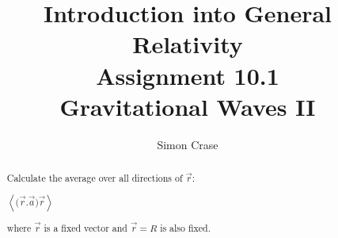 \documentclass[]{article}
\title{Introduction into General Relativity\\Assignment 10.1\\Gravitational Waves II}
\author{Simon Crase}
\begin{document}
\maketitle

\begin{abstract}
Calculate the average over all directions of $\vec{r}$:

$\left\langle \big(\vec{r}.\vec{a}\big)\vec{r} \right\rangle$

where $\vec{r}$ is a fixed vector and $\vec{r}=R$ is also fixed.
\end{abstract}

\section{}
\end{document}
